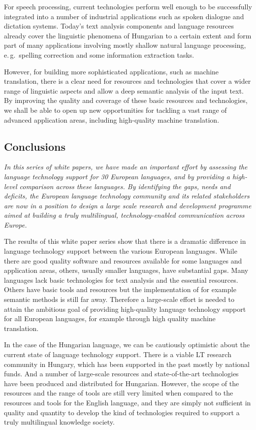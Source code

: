 \begin{multicols}{2}
For speech processing, current technologies perform well enough to be successfully integrated into a number of industrial applications such as spoken dialogue and dictation systems. Today's text analysis components and language resources already cover the linguistic phenomena of Hungarian to a certain extent and form part of many applications involving mostly shallow natural language processing, e.\,g.~spelling correction and some information extraction tasks.

However, for building more sophisticated applications, such as machine translation, there is a clear need for resources and technologies that cover a wider range of linguistic aspects and allow a deep semantic analysis of the input text. By improving the quality and coverage of these basic resources and technologies, we shall be able to open up new opportunities for tackling a vast range of advanced application areas, including high-quality machine translation.

\subsection{Conclusions}

\emph{In this series of white papers, we have made an important effort by assessing the language technology support for 30 European languages, and by providing a high-level comparison across these languages. By identifying the gaps, needs and deficits, the European language technology community and its related stakeholders are now in a position to design a large scale research and development programme aimed at building a truly multilingual, technology-enabled communication across Europe.}

The results of this white paper series show that there is a dramatic difference in language technology support between the various European languages. While there are good quality software and resources available for some languages and application areas, others, usually smaller languages, have substantial gaps. Many languages lack basic technologies for text analysis and the essential resources. Others have basic tools and resources but the implementation of for example semantic methods is still far away. Therefore a large-scale effort is needed to attain the ambitious goal of providing high-quality language technology support for all European languages, for example through high quality machine translation. 

In the case of the Hungarian language, we can be cautiously optimistic about the current state of language technology support. There is a viable LT research community in Hungary, which has been supported in the past mostly by national funds. And a number of large-scale resources and state-of-the-art technologies have been produced and distributed for Hungarian. However, the scope of the resources and the range of tools are still very limited when compared to the resources and tools for the English language, and they are simply not sufficient in quality and quantity to develop the kind of technologies required to support a truly multilingual knowledge society.


\end{multicols}
